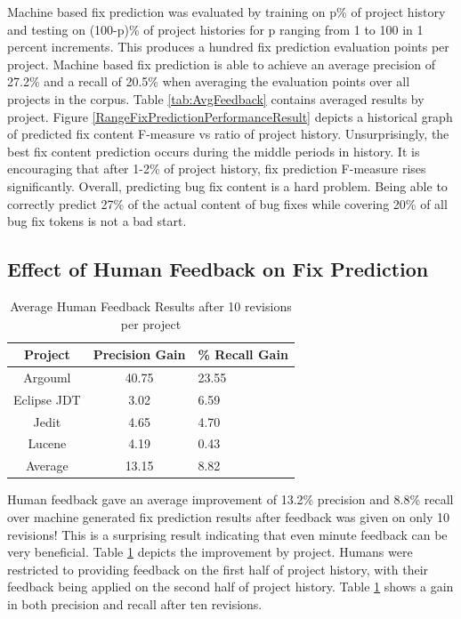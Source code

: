 \documentclass[10pt, conference, letterpaper, compsocconf]{IEEEtran}
\begin{document}
Machine based fix prediction was evaluated by training on p\% of project history and testing on (100-p)\% of project histories for p ranging from 1 to 100 in 1 percent increments.
This produces a hundred fix prediction evaluation points per project.
Machine based fix prediction is able to achieve an average precision of 27.2\% and
a recall of 20.5\% when averaging the evaluation points over all projects in the corpus. Table \ref{tab:AvgFeedback} contains averaged results by project. Figure \ref{RangeFixPredictionPerformanceResult}
 depicts a historical graph of predicted fix content F-measure vs ratio of project history. Unsurprisingly, the best fix content prediction
 occurs during the middle periods in history. It is encouraging that after 1-2\% of project history, fix prediction F-measure rises significantly.
Overall, predicting bug fix content is a hard problem. Being able to correctly predict 27\% of the actual content of bug fixes while covering 20\% of all bug fix tokens is not a bad start.


\subsection{Effect of Human Feedback on Fix Prediction}
\label{HumanFeedbackResults}

\begin{table}
\caption{Average Human Feedback Results after 10 revisions per project}
\label{tab:humanFeedback}
\begin{tabular}{|c|c|p{2.3cm}|}
\hline 
Project & Precision Gain & \% Recall Gain\\
\hline 
Argouml & 40.75 & 23.55\\
\hline  
Eclipse JDT & 3.02 & 6.59\\ 
\hline 
Jedit & 4.65 & 4.70\\
\hline  
Lucene & 4.19 & 0.43\\ 
\hline 
Average & 13.15 & 8.82\\
\hline 
\end{tabular}

\end{table}


Human feedback gave an average improvement of 13.2\% precision and 8.8\% recall over machine generated fix prediction results after feedback was given on only 10 revisions!
This is a surprising result indicating that even minute feedback can be very beneficial. Table \ref{tab:humanFeedback} depicts the improvement by project.
Humans were restricted to providing feedback on the first half of project history, with their feedback being applied on the second half of project history.
Table \ref{tab:humanFeedback} shows a gain in both precision and recall after ten revisions.
\end{document}
